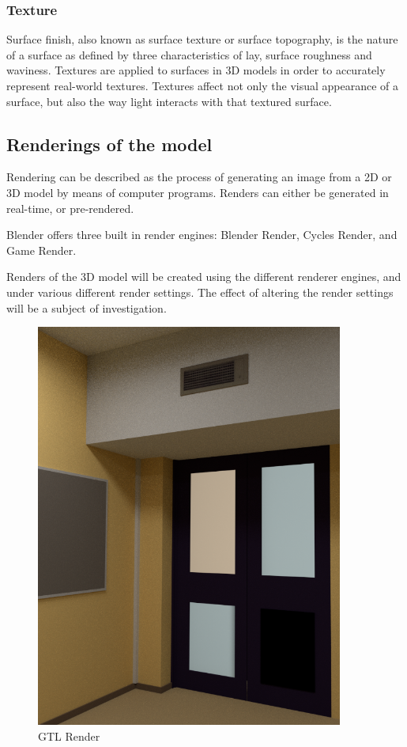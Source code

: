 \documentclass[11pt,a4paper]{report}
\begin{document}
			\subsubsection{Texture}
				Surface finish, also known as surface texture or surface topography, is the nature of a surface as defined by three characteristics of lay, surface roughness and waviness.
				\cite{e._paul_degarmo_materials_2003}
				Textures are applied to surfaces in 3D models in order to accurately represent real-world textures. Textures affect not only the visual appearance of a surface, but also the way light interacts with that textured surface.
			
		\subsection{Renderings of the model}
			Rendering can be described as the process of generating an image from a 2D or 3D model by means of computer programs. Renders can either be generated in real-time, or pre-rendered.
			
			Blender offers three built in render engines: Blender Render, Cycles Render, and Game Render.
			
			Renders of the 3D model will be created using the different renderer engines, and under various different render settings. The effect of altering the render settings will be a subject of investigation.
			
			\begin{figure}[H]
				\centering
				\includegraphics[width=0.9\textwidth]{gtl_render_1}
				\caption{GTL Render}
				\label{fig:gtl_render_1}
			\end{figure}
			
\end{document}
